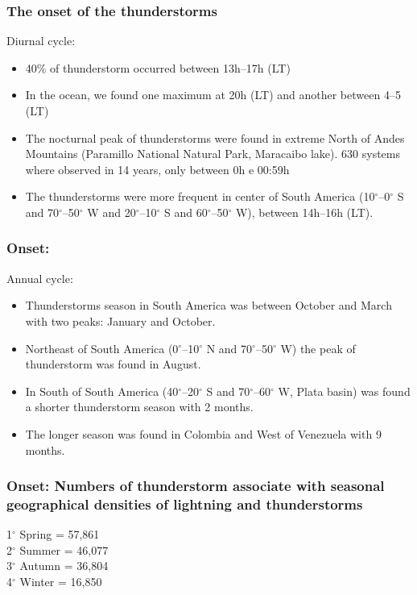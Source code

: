 \documentclass[smaller]{beamer}
\begin{document}
\begin{frame}
\frametitle{The onset of the thunderstorms}
\Large{Diurnal cycle:}
\begin{itemize}
\item 40\% of thunderstorm occurred between 13h--17h (LT)
\item In the ocean, we found one maximum at 20h (LT) and another between  4--5 (LT)
\item The nocturnal peak of thunderstorms were found in extreme North of Andes Mountains (Paramillo National Natural Park, Maracaibo lake). 630 systems where observed in 14 years, only between 0h e 00:59h
\item The thunderstorms were more frequent in center of South America (10$^{\circ}$--0$^{\circ}$ S and 70$^{\circ}$--50$^{\circ}$ W  and 20$^{\circ}$--10$^{\circ}$ S and 60$^{\circ}$--50$^{\circ}$ W), between 14h--16h (LT).
\end{itemize}

\end{frame}



\begin{frame}
\frametitle{Onset:}
\Large{Annual cycle:}
\begin{itemize}
\item Thunderstorms season in South America was between October and March with two peaks: January and October.
\item Northeast of South America (0$^{\circ}$--10$^{\circ}$ N and 70$^{\circ}$--50$^{\circ}$ W) the peak of thunderstorm was found in August.
\item In South of South America (40$^{\circ}$--20$^{\circ}$ S and 70$^{\circ}$--60$^{\circ}$ W, Plata basin) was found a shorter thunderstorm season with 2 months.  
\item The longer season was found in Colombia and West of Venezuela with 9 months.
\end{itemize}

\end{frame}

\begin{frame}
\frametitle{Onset: Numbers of thunderstorm associate with seasonal geographical densities of lightning and thunderstorms}
\Large
1$^{\circ}$ Spring = 57,861\\ 
2$^{\circ}$ Summer = 46,077\\
3$^{\circ}$ Autumn = 36,804\\
4$^{\circ}$ Winter = 16,850\\

\end{frame}
\end{document}
